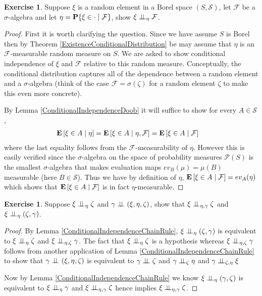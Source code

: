 \documentclass{amsart}
\theoremstyle{remark}
\theoremstyle{definition}
\newtheorem{ex}[thm]{Exercise}
\begin{document}
\begin{ex}Suppose $\xi$ is a random element in a Borel space $(S, \mathcal{S})$, let
  $\mathcal{F}$ be a $\sigma$-algebra and let $\eta =
  \cprobability{\mathcal{F}}{\xi \in \cdot}$, show $\cindependent{\xi}{\mathcal{F}}{\eta}$.
\end{ex}
\begin{proof}
First it is worth clarifying the question.  Since we have assume $S$
is Borel then by Theorem \ref{ExistenceConditionalDistribution} be may
assume that $\eta$ is an $\mathcal{F}$-measurable random measure on
$S$.  We are asked to show conditional independence of $\xi$ and
$\mathcal{F}$ relative to this random measure.  Conceptually, the
conditional distribution captures all of the dependence between a
random element and a $\sigma$-algebra (think of the case $\mathcal{F}
= \sigma(\zeta)$ for a random element $\zeta$ to make this even more concrete).  

By Lemma \ref{ConditionalIndependenceDoob} it will suffice to show for
every $A \in \mathcal{S}$, 
\begin{align*}
\cexpectationlong{\eta}{\xi \in  A} 
&= \cexpectationlong{\eta,\mathcal{F}}{\xi \in  A} 
= \cexpectationlong{\mathcal{F}}{\xi \in  A} 
\end{align*}
where the last equality follows from the $\mathcal{F}$-measurability
of $\eta$.  However this is easily verified since the $\sigma$-algebra
on the space of probability measures $\mathcal{P}(S)$ is the smallest $\sigma$-algebra that makes
evaluation maps $ev_B(\mu) = \mu(B)$ measurable (here $B \in \mathcal{S}$).  Thus we have by
definition of $\eta$, $\cexpectationlong{\mathcal{F}}{\xi \in  A} =
ev_A(\eta)$ which shows that $\cexpectationlong{\mathcal{F}}{\xi \in
  A}$ is in fact $\eta$-measurable.
\end{proof}

\begin{ex}Suppose $\cindependent{\xi}{\zeta}{\eta}$ and
  $\cindependent{\gamma}{(\xi,\eta, \zeta)}{}$, show that
  $\cindependent{\xi}{\zeta}{\eta,\gamma}$ and $\cindependent{\xi}{(\zeta,\gamma)}{\eta}$.
\end{ex}
\begin{proof}
By Lemma \ref{ConditionalIndependenceChainRule},
$\cindependent{\xi}{(\zeta,\gamma)}{\eta}$ is equivalent to
$\cindependent{\xi}{\zeta}{\eta}$ and
$\cindependent{\xi}{\gamma}{\eta, \zeta}$.  The fact that
$\cindependent{\xi}{\zeta}{\eta}$ is a hypothesis whereas
$\cindependent{\xi}{\gamma}{\eta, \zeta}$ follows from another
application of Lemma \ref{ConditionalIndependenceChainRule} to show
that $\cindependent{\gamma}{(\xi,\eta, \zeta)}{}$ is equivalent to
$\cindependent{\gamma}{\zeta}{}$ and
$\cindependent{\gamma}{\eta}{\zeta}$ and
$\cindependent{\gamma}{\xi}{\zeta, \eta}$

Now by Lemma \ref{ConditionalIndependenceChainRule} 
we know $\cindependent{\xi}{(\gamma, \zeta)}{\eta}$ is equivalent to
$\cindependent{\xi}{\gamma}{\eta}$ and
$\cindependent{\xi}{\zeta}{\eta, \gamma}$
hence implies $\cindependent{\xi}{\zeta}{\eta, \gamma}$.
\end{proof}
\end{document}
